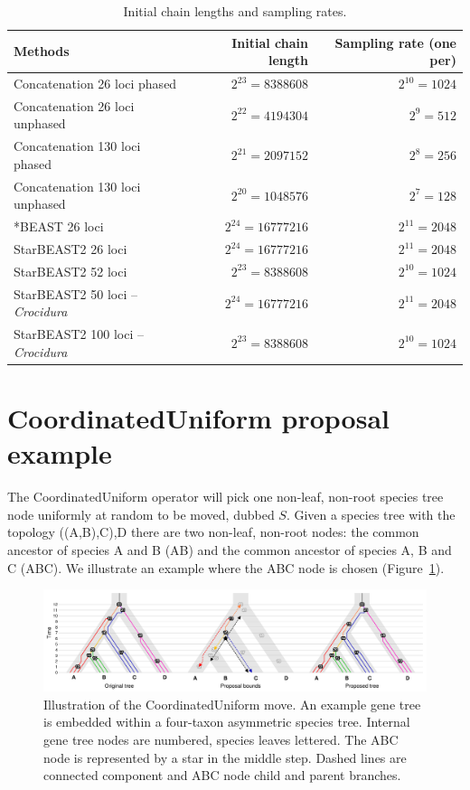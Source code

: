 \documentclass[12pt]{article}
\begin{document}
\begin{table}[htb!]
\centering
\caption{Initial chain lengths and sampling rates.}
\label{tab:chainLengths}
\begin{threeparttable}
\begin{adjustbox}{center}
\begin{tabular}{|l|r|r|}
\hline
Methods & Initial chain length & Sampling rate (one per)\tabularnewline
\hline
Concatenation 26 loci phased & $2^{23} = 8388608$ & $2^{10} = 1024$\tabularnewline
\hline
Concatenation 26 loci unphased & $2^{22} = 4194304$ & $2^{9} = 512$\tabularnewline
\hline
Concatenation 130 loci phased & $2^{21} = 2097152$ & $2^{8} = 256$\tabularnewline
\hline
Concatenation 130 loci unphased & $2^{20} = 1048576$ & $2^{7} = 128$\tabularnewline
\hline
*BEAST 26 loci & $2^{24} = 16777216$ & $2^{11} = 2048$\tabularnewline
\hline
StarBEAST2 26 loci & $2^{24} = 16777216$ & $2^{11} = 2048$\tabularnewline
\hline
StarBEAST2 52 loci & $2^{23} = 8388608$ & $2^{10} = 1024$\tabularnewline
\hline
StarBEAST2 50 loci -- \textit{Crocidura} & $2^{24} = 16777216$ & $2^{11} = 2048$\tabularnewline
\hline
StarBEAST2 100 loci -- \textit{Crocidura} & $2^{23} = 8388608$ & $2^{10} = 1024$\tabularnewline
\hline
\end{tabular}
\end{adjustbox}
\end{threeparttable}
\end{table}

\clearpage

\section{CoordinatedUniform proposal example}

The CoordinatedUniform operator will pick one non-leaf, non-root species tree
node uniformly at random to be moved, dubbed $S$. Given a species tree with
the topology ((A,B),C),D there are two non-leaf, non-root nodes: the common
ancestor of species A and B (AB) and the common ancestor of species A, B and C
(ABC). We illustrate an example where the ABC node is chosen
(Figure~\ref{fig:coordinatedUniform}).

\begin{figure}[htb!]
\centering
\includegraphics[width=130mm]{coordinated_uniform.pdf}
\caption
{Illustration of the CoordinatedUniform move. An example gene tree is embedded
within a four-taxon asymmetric species tree. Internal gene tree nodes
are numbered, species leaves lettered. The ABC node is represented by a star
in the middle step. Dashed lines are connected component and ABC
node child and parent branches.}
\label{fig:coordinatedUniform}
\end{figure}
\end{document}
